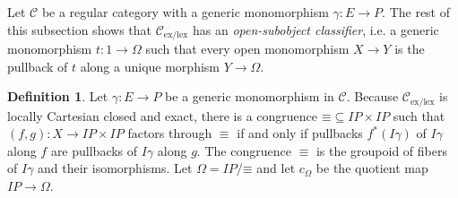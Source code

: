 \documentclass[sort&compress]{elsarticle}
\theoremstyle{plain}
\theoremstyle{definition}
\newtheorem{defin}[theorem]{Definition}
\theoremstyle{remark}
\newcommand\hide[1]{}
\newcommand\cat\mathcal
\newcommand\exlex{_\mathrm{ex/lex}}
\begin{document}
\newcommand\exeq{\equiv}
\hide{%
\newcommand\cl{\mathcal O}
\begin{defin} For each object $X$ of $\cat C\exlex$ a \emph{open subobject} is an isomorphism class of open monomorphisms to $X$. Let $\cl(X)$ be the \emph{set} of open subobjects. Note that $\cl$ is a functor $\cat C\exlex\dual \to \Set$, because open monomorphisms are stable under pullback. \end{defin}

Let $\cat C$ be a regular category with a generic monomorphism $\gamma:E\to P$. I show next that $\cat C\exlex$ has an object $\Omega$ that represents $\cl$: the .
\begin{defin} Let $\gamma:E\to P$ be a generic monomorphism in $\cat C$. Because $\cat C\exlex$ is locally Cartesian closed, the inverse image maps $f\inv:\sub(Y)\to \sub(x)$ of each $f:X\to Y$ in $\cat C\exlex$ has a right adjoint $\forall_f$ which satisfies the Beck-Chevalley condition. Thank to these right adjoints, the following congruence on $IP$ exists in $\cat C\exlex$.
\[ (p\exeq q) \iff (p\in \db{I\gamma} \leftrightarrow q\in \db{I\gamma}) \]
Here $\db{I\gamma}$ is the subobject containing all monics isomorphic to $I\gamma$. Let $\Omega = IP/\mathord\exeq$ and let $c_\Omega$ be the quotient map $IP \to \Omega$.
\end{defin}
}


Let $\cat C$ be a regular category with a generic monomorphism $\gamma:E\to P$. The rest of this subsection shows that $\cat C\exlex$ has an \emph{open-subobject classifier}, i.e. a generic monomorphism $t:1\to\Omega$ such that every open monomorphism $X\to Y$ is the pullback of $t$ along a unique morphism $Y\to \Omega$.

\begin{defin} Let $\gamma:E\to P$ be a generic monomorphism in $\cat C$. Because $\cat C\exlex$ is locally Cartesian closed and exact, there is a congruence $\mathord\exeq\subseteq IP\times IP$ such that $(f,g):X\to IP\times IP$ factors through $\exeq$ if and only if pullbacks $f^*(I\gamma)$ of $I\gamma$ along $f$ are pullbacks of $I\gamma$ along $g$. The congruence $\exeq$ is the groupoid of fibers of $I\gamma$ and their isomorphisms. Let $\Omega = IP/\mathord\exeq$ and let $c_\Omega$ be the quotient map $IP \to \Omega$.
\end{defin}
\end{document}
